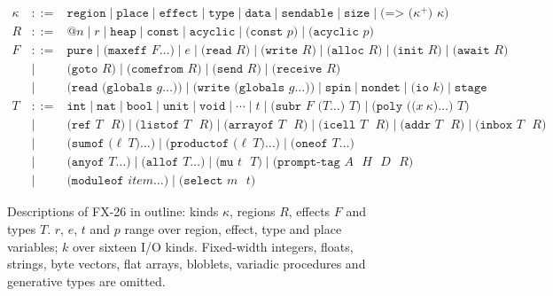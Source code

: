 \documentclass[acmsmall,screen,review]{acmart}
\newcommand{\cd}[1]{\texttt{#1}}
\newcommand{\fx}{FX-26}
\begin{document}
\begin{figure}[t]
\small
\[
\begin{array}{rcl}
\kappa &::=& \cd{region} \mid \cd{place} \mid \cd{effect} \mid \cd{type}
   \mid \cd{data} \mid \cd{sendable} \mid \cd{size} \mid \cd{(=> ($\kappa^+$) $\kappa$)}\\[2pt]
R &::=& \cd{@}n \mid r \mid \cd{heap} \mid \cd{const} \mid \cd{acyclic}
   \mid \cd{(const $p$)} \mid \cd{(acyclic $p$)}\\[2pt]
F &::=& \cd{pure} \mid \cd{(maxeff $F \ldots$)} \mid e
   \mid \cd{(read $R$)} \mid \cd{(write $R$)} \mid \cd{(alloc $R$)}
   \mid \cd{(init $R$)} \mid \cd{(await $R$)}\\
  &\mid& \cd{(goto $R$)} \mid \cd{(comefrom $R$)}
   \mid \cd{(send $R$)} \mid \cd{(receive $R$)}\\
  &\mid& \cd{(read (globals $g \ldots$))} \mid \cd{(write (globals $g \ldots$))}
   \mid \cd{spin} \mid \cd{nondet} \mid \cd{(io $k$)} \mid \cd{stage}\\[2pt]
T &::=& \cd{int} \mid \cd{nat} \mid \cd{bool} \mid \cd{unit} \mid \cd{void}
   \mid \cdots \mid t
   \mid \cd{(subr $F$ ($T \ldots$) $T$)}
   \mid \cd{(poly (($x\ \kappa$)$\ldots$) $T$)}\\
  &\mid& \cd{(ref $T$ $R$)} \mid \cd{(listof $T$ $R$)}
   \mid \cd{(arrayof $T$ $R$)} \mid \cd{(icell $T$ $R$)}
   \mid \cd{(addr $T$ $R$)} \mid \cd{(inbox $T$ $R$)}\\
  &\mid& \cd{(sumof ($\ell\ T$)$\ldots$)} \mid \cd{(productof ($\ell\ T$)$\ldots$)}
   \mid \cd{(oneof $T \ldots$)}\\
  &\mid& \cd{(anyof $T \ldots$)}
   \mid \cd{(allof $T \ldots$)} \mid \cd{(mu $t$ $T$)}
   \mid \cd{(prompt-tag $A$ $H$ $D$ $R$)}\\
  &\mid& \cd{(moduleof $\mathit{item} \ldots$)} \mid \cd{(select $m$ $t$)}
\end{array}
\]
\caption{Descriptions of \fx{} in outline: kinds $\kappa$, regions $R$,
effects $F$ and types $T$. $r$, $e$, $t$ and $p$ range over region,
effect, type and place variables; $k$ over sixteen I/O kinds. Fixed-width
integers, floats, strings, byte vectors, flat arrays, bloblets,
variadic procedures and generative types are omitted.}
\label{fig:grammar}
\end{figure}
\end{document}
